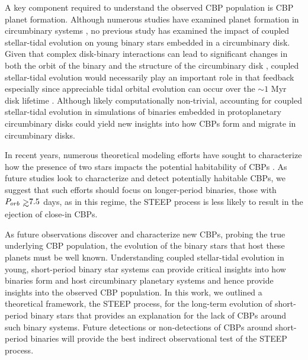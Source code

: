 A key component required to understand the observed CBP population is CBP planet formation.  Although numerous studies have examined planet formation in circumbinary systems \citep[e.g.][]{Alexander2012,Paardekooper2012,Meschiari2012a,Meschiari2012b,Pelupessy2013,Bromley2015,Vartanyan2016}, no previous study has examined the impact of coupled stellar-tidal evolution on young binary stars embedded in a circumbinary disk.  Given that complex disk-binary interactions can lead to significant changes in both the orbit of the binary and the structure of the circumbinary disk \citep[e.g.][]{Fleming2017}, coupled stellar-tidal evolution would necessarily play an important role in that feedback especially since appreciable tidal orbital evolution can occur over the ${\sim}1$ Myr disk lifetime \citep{Haisch2001}.  Although likely computationally non-trivial, accounting for coupled stellar-tidal evolution in simulations of binaries embedded in protoplanetary circumbinary disks could yield new insights into how CBPs form and migrate in circumbinary disks.

In recent years, numerous theoretical modeling efforts have sought to characterize how the presence of two stars impacts the potential habitability of CBPs \citep[e.g.][]{Kane2013,Forgan2014,Popp2017}.  As future studies look to characterize and detect potentially habitable CBPs, we suggest that such efforts should focus on longer-period binaries, those with $P_{orb} \gsim 7.5$ days, as in this regime, the STEEP process is less likely to result in the ejection of close-in CBPs.

As future observations discover and characterize new CBPs, probing the true underlying CBP population, the evolution of the binary stars that host these planets must be well known.    Understanding coupled stellar-tidal evolution in young, short-period binary star systems can provide critical insights into how binaries form and host circumbinary planetary systems and hence provide insights into the observed CBP population.  In this work, we outlined a theoretical framework, the STEEP process, for the long-term evolution of short-period binary stars that provides an explanation for the lack of CBPs around such binary systems.  Future detections or non-detections of CBPs around short-period binaries will provide the best indirect observational test of the STEEP process.


